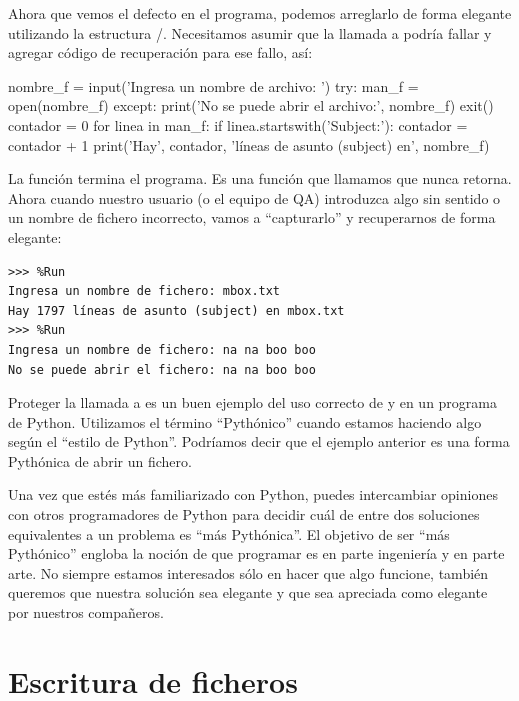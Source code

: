 Ahora que vemos el defecto en el programa, podemos arreglarlo de forma
elegante utilizando la estructura /.
Necesitamos asumir que la llamada a  podría fallar y
agregar código de recuperación para ese fallo, así:

\begin{python}[frame=single]
nombre_f = input('Ingresa un nombre de archivo: ')
try:
    man_f = open(nombre_f)
except:
    print('No se puede abrir el archivo:', nombre_f)
    exit()
contador = 0
for linea in man_f:
    if linea.startswith('Subject:'):
        contador = contador + 1
print('Hay', contador, 'líneas de asunto (subject) en', nombre_f)
\end{python}

La función  termina el programa. Es una función que
llamamos que nunca retorna. Ahora cuando nuestro usuario (o el equipo de
QA) introduzca algo sin sentido o un nombre de fichero incorrecto, vamos
a ``capturarlo'' y recuperarnos de forma elegante:

\begin{Verbatim}[frame=single]
>>> %Run
Ingresa un nombre de fichero: mbox.txt
Hay 1797 líneas de asunto (subject) en mbox.txt
>>> %Run
Ingresa un nombre de fichero: na na boo boo
No se puede abrir el fichero: na na boo boo
\end{Verbatim}

Proteger la llamada a  es un buen ejemplo del uso correcto
de  y  en un programa de Python. Utilizamos
el término ``Pythónico'' cuando estamos haciendo algo según el ``estilo
de Python''. Podríamos decir que el ejemplo anterior es una forma
Pythónica de abrir un fichero.

Una vez que estés más familiarizado con Python, puedes intercambiar
opiniones con otros programadores de Python para decidir cuál de entre
dos soluciones equivalentes a un problema es ``más Pythónica''. El
objetivo de ser ``más Pythónico'' engloba la noción de que programar es
en parte ingeniería y en parte arte. No siempre estamos interesados sólo
en hacer que algo funcione, también queremos que nuestra solución sea
elegante y que sea apreciada como elegante por nuestros compañeros.

\hypertarget{escritura-de-ficheros}{%
\section{Escritura de ficheros}\label{escritura-de-ficheros}}

